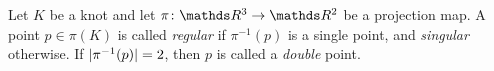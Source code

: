 Let \(K\) be a knot and let \(\pi \colon \rthree \rightarrow \rtwo\) be a projection map. A point \(p \in \pi(K)\) is called \textit{regular} if \(\pi^{-1}(p)\) is a single point, and \textit{singular} otherwise. If \(\lvert\pi^{-1}(p)\rvert = 2\), then \(p\) is called a \textit{double} point.


%
%
%

%
%

